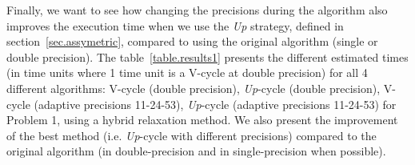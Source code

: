 \documentclass[10pt,conference]{IEEEtran}
\begin{document}
   Finally, we want to see how changing the precisions during the algorithm also improves the execution time when we use the \emph{Up} strategy, defined in section~\ref{sec.assymetric}, compared to using the original algorithm (single or double precision).
   The table~\ref{table.results1} presents the different estimated times (in time units where 1 time unit is a V-cycle at double precision)
   for all 4 different algorithms: V-cycle (double precision), \emph{Up}-cycle (double precision), V-cycle (adaptive precisions 11-24-53), \emph{Up}-cycle (adaptive precisions 11-24-53) for Problem 1, using a hybrid relaxation method.
   We also present the improvement of the best method (i.e. \emph{Up}-cycle with different precisions) compared to the original algorithm (in double-precision and in single-precision when possible).
  
\end{document}

